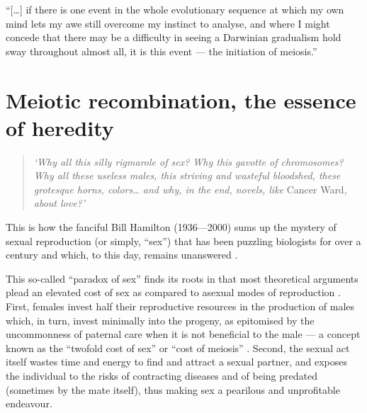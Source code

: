 \begin{savequote}[8cm]
“[…] if there is one event in the whole evolutionary sequence at which my own mind lets my awe still overcome my instinct to analyse, and where I might concede that there may be a difficulty in seeing a Darwinian gradualism hold sway throughout almost all, it is this event — the initiation of meiosis.”
	
\end{savequote}

\chapter{\label{ch:2-recombination-mechanistics}Meiotic recombination, the essence of heredity} 

\minitoc{}


\begin{quote}
\textit{‘Why all this silly rigmarole of sex? Why this gavotte of chromosomes? Why all these useless males, this striving and wasteful bloodshed, these grotesque horns, colors… and why, in the end, novels, like }Cancer Ward\textit{, about love?’}

\end{quote}

This is how the fanciful Bill Hamilton (1936—2000) sums up the mystery of sexual reproduction (or simply, “sex”) that has been puzzling biologists for over a century and which, to this day, remains unanswered \citep{de2007evolution, otto2009evolutionary}.

This so-called “paradox of sex” finds its roots in that most theoretical arguments plead an elevated cost of sex as compared to asexual modes of reproduction \citep{otto2002evolution,lehtonen2012many}.
First, females invest half their reproductive resources in the production of males which, in turn, invest minimally into the progeny, as epitomised by the uncommonness of paternal care when it is not beneficial to the male \citep{smith1977parental,fromhage2007stability} — a concept known as the “twofold cost of sex” or “cost of meiosis” \citep{bell1982masterpiece}.
Second, the sexual act itself wastes time and energy to find and attract a sexual partner, and exposes the individual to the risks of contracting diseases and of being predated (sometimes by the mate itself), thus making sex a pearilous and unprofitable endeavour.

